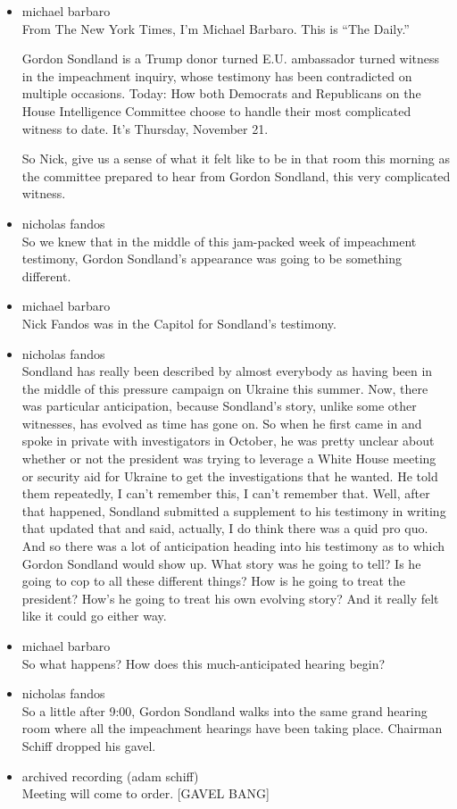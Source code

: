 \begin{itemize}
\item
  michael barbaro\\
  From The New York Times, I'm Michael Barbaro. This is ``The Daily.''

  Gordon Sondland is a Trump donor turned E.U. ambassador turned witness
  in the impeachment inquiry, whose testimony has been contradicted on
  multiple occasions. Today: How both Democrats and Republicans on the
  House Intelligence Committee choose to handle their most complicated
  witness to date. It's Thursday, November 21.

  So Nick, give us a sense of what it felt like to be in that room this
  morning as the committee prepared to hear from Gordon Sondland, this
  very complicated witness.
\item
  nicholas fandos\\
  So we knew that in the middle of this jam-packed week of impeachment
  testimony, Gordon Sondland's appearance was going to be something
  different.
\item
  michael barbaro\\
  Nick Fandos was in the Capitol for Sondland's testimony.
\item
  nicholas fandos\\
  Sondland has really been described by almost everybody as having been
  in the middle of this pressure campaign on Ukraine this summer. Now,
  there was particular anticipation, because Sondland's story, unlike
  some other witnesses, has evolved as time has gone on. So when he
  first came in and spoke in private with investigators in October, he
  was pretty unclear about whether or not the president was trying to
  leverage a White House meeting or security aid for Ukraine to get the
  investigations that he wanted. He told them repeatedly, I can't
  remember this, I can't remember that. Well, after that happened,
  Sondland submitted a supplement to his testimony in writing that
  updated that and said, actually, I do think there was a quid pro quo.
  And so there was a lot of anticipation heading into his testimony as
  to which Gordon Sondland would show up. What story was he going to
  tell? Is he going to cop to all these different things? How is he
  going to treat the president? How's he going to treat his own evolving
  story? And it really felt like it could go either way.
\item
  michael barbaro\\
  So what happens? How does this much-anticipated hearing begin?
\item
  nicholas fandos\\
  So a little after 9:00, Gordon Sondland walks into the same grand
  hearing room where all the impeachment hearings have been taking
  place. Chairman Schiff dropped his gavel.
\item
  archived recording (adam schiff)\\
  Meeting will come to order. {[}GAVEL BANG{]}
\end{itemize}

